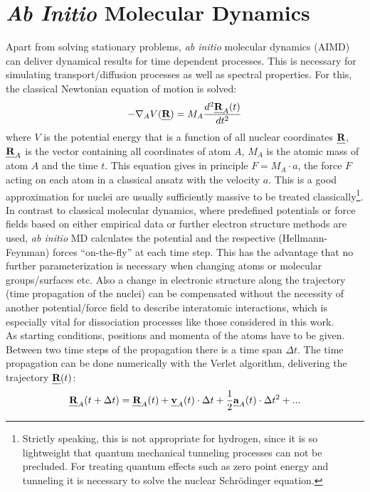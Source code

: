\documentclass[11pt,DIV=13,BCOR=5mm,a4paper,headinclude]{scrbook}
\def\mathbi#1{\textbf{\em #1}}
\renewcommand{\vec}[1]{\mathbi{#1}}
\begin{document}
\section{\textit{Ab Initio} Molecular Dynamics}
Apart from solving stationary problems, \textit{ab initio} molecular dynamics (AIMD) can deliver dynamical results for time dependent processes\cite{jensen,marx_hutter_AIMD}.
This is necessary for simulating transport/diffusion processes as well as spectral properties.
For this, the classical Newtonian equation of motion is solved:
\begin{equation}
 -\nabla_A V(\vec{R})=M_A\frac{d^2 \vec{R}_A(t)}{dt^2}
\end{equation}
where $V$ is the potential energy that is a function of all nuclear coordinates $\vec{R}$, $\vec{R}_A$ is the vector containing all coordinates of atom $A$, $M_A$ is the atomic mass of atom $A$ and the time $t$.
This equation gives in principle $F=M_A\cdot a$, the force $F$ acting on each atom in a classical ansatz with the velocity $a$.
This is a good approximation for nuclei are usually sufficiently massive to be treated classically\footnote{Strictly speaking, this is not appropriate for hydrogen, since it is so lightweight that quantum mechanical tunneling processes can not be precluded.
For treating quantum effects such as zero point energy and tunneling it is necessary to solve the nuclear Schrödinger equation.}.
\\
In contrast to classical molecular dynamics, where predefined potentials or force fields based on either empirical data or further electron structure methods are used, \textit{ab initio} MD calculates the potential and the respective (Hellmann-Feynman) forces ``on-the-fly'' at each time step.
This has the advantage that no further parameterization is necessary when changing atoms or molecular groups/surfaces etc. Also a change in electronic structure along the trajectory (time propagation of the nuclei) can be compensated without the necessity of another potential/force field to describe interatomic interactions, which is especially vital for dissociation processes like those considered in this work.
\\
As starting conditions, positions and momenta of the atoms have to be given.
Between two time steps of the propagation there is a time span $\Delta t$.
The time propagation can be done numerically with the Verlet algorithm\cite{verlet}, delivering the trajectory $\vec{R}(t)$:
\begin{equation}\label{eq:t+dt}
 \vec{R}_A(t+\Delta t) = \vec{R}_A(t) + \vec{v}_A(t)\cdot \Delta t + \frac{1}{2}\vec{a}_A(t)\cdot \Delta t^2 + ...
 \end{equation}
\end{document}
